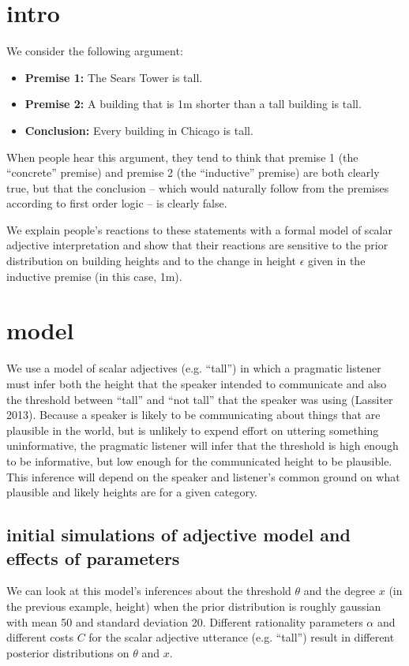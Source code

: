 \documentclass[10pt]{article}
\begin{document}
\setlength{\droptitle}{-1.5cm}
\maketitle

\section{intro}
  We consider the following argument:
  
  \begin{itemize}
   \item[] \textbf{Premise 1:} The Sears Tower is tall.
   \item[] \textbf{Premise 2:} A building that is 1m shorter than a tall building is tall.
   \item[] \textbf{Conclusion:} Every building in Chicago is tall.
  \end{itemize}
  
  When people hear this argument, they tend to think that premise 1 (the ``concrete'' premise) and premise 2 (the ``inductive'' premise) are both clearly true, but that the conclusion -- which would naturally follow from the premises according to first order logic -- is clearly false.
  
  We explain people's reactions to these statements with a formal model of scalar adjective interpretation and show that their reactions are sensitive to the prior distribution on building heights and to the change in height $\epsilon$ given in the inductive premise (in this case, 1m).
  
\section{model}
  We use a model of scalar adjectives (e.g. ``tall'') in which a pragmatic listener must infer both the height that the speaker intended to communicate and also the threshold between ``tall'' and ``not tall'' that the speaker was using (Lassiter 2013). Because a speaker is likely to be communicating about things that are plausible in the world, but is unlikely to expend effort on uttering something uninformative, the pragmatic listener will infer that the threshold is high enough to be informative, but low enough for the communicated height to be plausible. This inference will depend on the speaker and listener's common ground on what plausible and likely heights are for a given category.
  
  \subsection{initial simulations of adjective model and effects of parameters}
    We can look at this model's inferences about the threshold $\theta$ and the degree $x$ (in the previous example, height) when the prior distribution is roughly gaussian with mean 50 and standard deviation 20. Different rationality parameters $\alpha$ and different costs $C$ for the scalar adjective utterance (e.g. ``tall'') result in different posterior distributions on $\theta$ and $x$.
    
\end{document}
